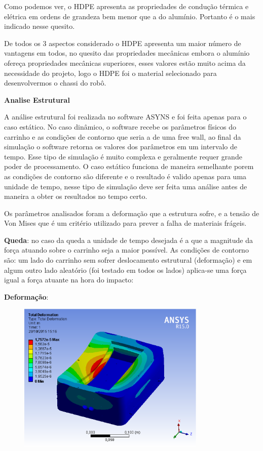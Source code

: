 Como podemos ver, o HDPE apresenta as propriedades de condução térmica e elétrica em ordens de grandeza bem menor que a do alumínio. Portanto é o mais indicado nesse quesito.

De todos os 3 aspectos considerado o HDPE apresenta um maior número de vantagens em todos, no quesito das propriedades mecânicas embora o alumínio ofereça propriedades mecânicas superiores, esses valores estão muito acima da necessidade do projeto, logo o HDPE foi o material selecionado para desenvolvermos o chassi do robô.
 
\textbf{Analise Estrutural}

A análise estrutural foi realizada no software ASYNS e foi feita apenas para o caso estático. No caso dinâmico, o software recebe os parâmetros físicos do carrinho e as condições de contorno que seria a de uma free wall, ao final da simulação o software retorna os valores dos parâmetros em um intervalo de tempo. Esse tipo de simulação é muito complexa e geralmente requer grande poder de processamento. O caso estático funciona de maneira semelhante porem as condições de contorno são diferente e o resultado é valido apenas para uma unidade de tempo, nesse tipo de simulação deve ser feita uma análise antes de maneira a obter os resultados no tempo certo.

Os parâmetros analisados foram a deformação que a estrutura sofre, e a tensão de Von Mises que é um critério utilizado para prever a falha de materiais frágeis.

\textbf{Queda}: no caso da queda a unidade de tempo desejada é a que a magnitude da força atuando sobre o carrinho seja a maior possível. As condições de contorno são: um lado do carrinho sem sofrer deslocamento estrutural (deformação) e em algum outro lado aleatório (foi testado em todos os lados) aplica-se uma força igual a força atuante na hora do impacto:

\textbf{Deformação}:

\begin{figure}[H]
    \centering
    \includegraphics[width=0.8\textwidth]{figuras/deformacao_1000n.eps}
    \caption{}
    \label{fig:catia01}
\end{figure}

